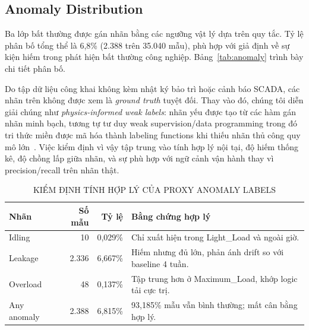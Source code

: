 \subsection{Anomaly Distribution}

Ba lớp bất thường được gán nhãn bằng các ngưỡng vật lý dựa trên quy tắc.
Tỷ lệ phân bố tổng thể là 6,8\% (2.388 trên 35.040 mẫu),
phù hợp với giả định về sự kiện hiếm trong phát hiện bất thường công nghiệp.
Bảng~\ref{tab:anomaly} trình bày chi tiết phân bố.

\begin{table}[htbp]
\caption{PHÂN BỐ NHÃN BẤT THƯỜNG}
\label{tab:anomaly}
\centering
\small
{}
\end{table}

Do tập dữ liệu công khai không kèm nhật ký bảo trì hoặc cảnh báo SCADA, các nhãn trên
không được xem là \textit{ground truth} tuyệt đối. Thay vào đó, chúng tôi diễn giải
chúng như \textit{physics-informed weak labels}: nhãn yếu được tạo từ các hàm gán nhãn
minh bạch, tương tự tư duy weak supervision/data programming trong đó tri thức miền
được mã hóa thành labeling functions khi thiếu nhãn thủ công quy mô lớn~\cite{ratner2016data,ratner2017snorkel}.
Việc kiểm định vì vậy tập trung vào tính hợp lý nội tại, độ hiếm thống kê, độ chồng lấp
giữa nhãn, và sự phù hợp với ngữ cảnh vận hành thay vì precision/recall trên nhãn thật.

\begin{table}[htbp]
\caption{KIỂM ĐỊNH TÍNH HỢP LÝ CỦA PROXY ANOMALY LABELS}
\label{tab:proxy_validation}
\centering
\small
\begin{tabular}{@{}lrrp{3.2cm}@{}}
\toprule
Nhãn & Số mẫu & Tỷ lệ & Bằng chứng hợp lý \\
\midrule
Idling & 10 & 0,029\% & Chỉ xuất hiện trong Light\_Load và ngoài giờ. \\
Leakage & 2.336 & 6,667\% & Hiếm nhưng đủ lớn, phản ánh drift so với baseline 4 tuần. \\
Overload & 48 & 0,137\% & Tập trung hơn ở Maximum\_Load, khớp logic tải cực trị. \\
Any anomaly & 2.388 & 6,815\% & 93,185\% mẫu vẫn bình thường; mất cân bằng hợp lý. \\
\bottomrule
\end{tabular}
\end{table}

